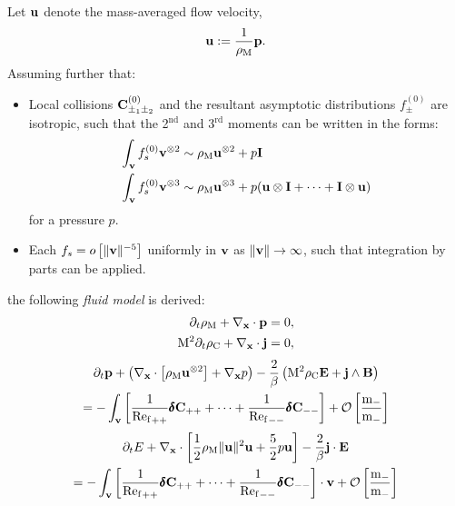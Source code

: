     Let $\mathbf{u}$ denote the mass-averaged flow velocity,
    \begin{equation}
        \mathbf{u}  :=  \frac{1}{\rho_{\mathrm{M}}}\mathbf{p}.
    \end{equation}
    Assuming further that:
    \begin{itemize}
        \item  Local collisions $\mathbf{C}_{\pm_{1}\pm_{2}}^{(0)}$ and the resultant asymptotic distributions $f_{\pm}^{(0)}$ are isotropic, such that the 2$^{\text{nd}}$ and 3$^{\text{rd}}$ moments can be written in the forms:
        \begin{align}
            \int_{\mathbf{v}}f_{s}^{(0)}\mathbf{v}^{\otimes 2}  &\sim  \rho_{\mathrm{M}}\mathbf{u}^{\otimes 2} + p\mathbf{I}  \label{eqn:isotropic 2nd moment}  \\
            \int_{\mathbf{v}}f_{s}^{(0)}\mathbf{v}^{\otimes 3}  &\sim  \rho_{\mathrm{M}}\mathbf{u}^{\otimes 3} + p(\mathbf{u}\otimes\mathbf{I} + \cdots + \mathbf{I}\otimes\mathbf{u})  \label{eqn:isotropic 3rd moment}
        \end{align}
        for a pressure $p$. 
        \item  Each $f_{s}  =  o\left[\|\mathbf{v}\|^{- 5}\right]$ uniformly in $\mathbf{v}$ as $\|\mathbf{v}\|  \rightarrow  \infty$, such that integration by parts can be applied.
    \end{itemize}
    the following \emph{fluid model} is derived:
    \begin{align}
        \partial_{t}\rho_{\mathrm{M}} + \nabla_{\mathbf{x}}\cdot\mathbf{p}  &=  0,  \label{eqn:mass conservation introduction}  \\
        \mathrm{M}^{2}\partial_{t}\rho_{\mathrm{C}} + \nabla_{\mathbf{x}}\cdot\mathbf{j}  &=  0,
    \end{align}
    \vspace{-25pt}
    \begin{multline}
        \partial_{t}\mathbf{p} + \left(\nabla_{\mathbf{x}}\cdot\left[\rho_{\mathrm{M}}\mathbf{u}^{\otimes 2}\right] + \nabla_{\mathbf{x}}p\right) - \frac{2}{\beta}\left(\mathrm{M}^{2}\rho_{\mathrm{C}}\mathbf{E} + \mathbf{j}\wedge\mathbf{B}\right)  \\
        =  - \int_{\mathbf{v}}\left[\frac{1}{{\mathrm{Re}_{\mathrm{f}}}_{++}}\pmb{\mathsf{\delta}}\mathbf{C}_{++} + \cdots + \frac{1}{{\mathrm{Re}_{\mathrm{f}}}_{--}}\pmb{\mathsf{\delta}}\mathbf{C}_{--}\right] + \mathcal{O}\left[\frac{\mathrm{m}_{-}}{\mathrm{m}_{-}}\right]
    \end{multline}
    \vspace{-15pt}
    \begin{multline}
        \partial_{t}E + \nabla_{\mathbf{x}}\cdot\left[\frac{1}{2}\rho_{\mathrm{M}}\|\mathbf{u}\|^{2}\mathbf{u} + \frac{5}{2}p\mathbf{u}\right] - \frac{2}{\beta}\mathbf{j}\cdot\mathbf{E}  \\
        =  - \int_{\mathbf{v}}\left[\frac{1}{{\mathrm{Re}_{\mathrm{f}}}_{++}}\pmb{\mathsf{\delta}}\mathbf{C}_{++} + \cdots + \frac{1}{{\mathrm{Re}_{\mathrm{f}}}_{--}}\pmb{\mathsf{\delta}}\mathbf{C}_{--}\right]\cdot\mathbf{v} + \mathcal{O}\left[\frac{\mathrm{m}_{-}}{\mathrm{m}_{-}}\right]
    \end{multline}
